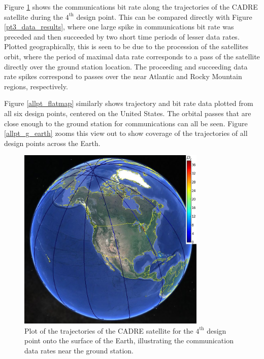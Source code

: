 \documentclass[]{aiaa-tc} %
\begin{document}
    Figure \ref{pt3_g_earth} shows the communications bit rate along the trajectories of the
    CADRE satellite during the $4^{\textrm{th}}$ design point. This can be compared
    directly with Figure \ref{pt3_data_results}, where one large spike in communications
    bit rate was preceded and then succeeded by two short time periods of lesser
    data rates. Plotted geographically, this is seen to be due to the procession of
    the satellites orbit, where the period of maximal data rate corresponds to a
    pass of the satellite directly over the ground station location. The proceeding and
    succeeding data rate spikes correspond to passes over the near Atlantic and
    Rocky Mountain regions, respectively.


    Figure \ref{allpt_flatmap} similarly shows trajectory and bit rate data plotted
    from all six design points, centered on the United States. The orbital passes
    that are close enough to the ground station for communications can all be seen.
    Figure \ref{allpt_g_earth} zooms this view out to show coverage of the trajectories
    of all design points across the Earth.


    \begin{figure}
    \centering
    \includegraphics[width=0.8\textwidth]{images/pt3_gearth3.png}
    \caption[width=0.4\textwidth]{Plot of the trajectories of the CADRE satellite
    for the $4^{\textrm{th}}$ design point onto the surface of the Earth, illustrating the
    communication data rates near the ground station.}
    \label{pt3_g_earth}
    \end{figure}
\end{document}
